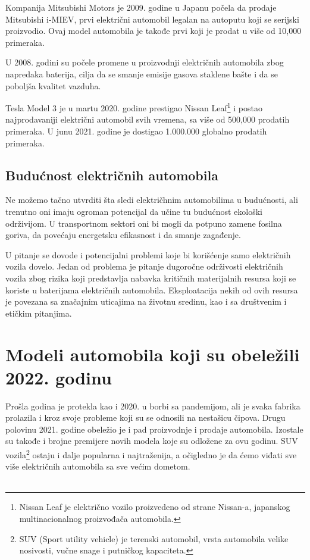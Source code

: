 \documentclass[a4paper]{article}
\begin{document}
Kompanija Mitsubishi Motors je 2009. godine u Japanu počela da prodaje Mitsubishi i-MIEV, prvi električni automobil legalan na autoputu koji se serijski proizvodio. Ovaj model automobila je takođe prvi koji je prodat u više od 10,000 primeraka.

U 2008. godini su počele promene u proizvodnji električnih automobila zbog napredaka baterija, cilja da se smanje emisije gasova staklene bašte i da se poboljša kvalitet vazduha.

Tesla Model 3 je u martu 2020. godine prestigao Nissan Leaf\footnote{Nissan Leaf je električno vozilo proizvedeno od strane Nissan-a, japanskog multinacionalnog proizvođača automobila.} i postao najprodavaniji električni automobil svih vremena, sa više od 500,000 prodatih primeraka. U junu 2021. godine je dostigao 1.000.000 globalno prodatih primeraka.


\subsection{Budućnost električnih automobila}
\label{subsec:podnaslov3}


Ne možemo tačno utvrditi šta sledi električhnim automobilima u budućnosti, ali trenutno oni imaju ogroman potencijal da učine tu budućnost ekološki održivijom. U transportnom sektori oni bi mogli da potpuno zamene fosilna goriva, da povećaju energetsku efikasnost i da smanje zagađenje.

U pitanje se dovode i potencijalni problemi koje bi korišćenje samo električnih vozila dovelo. Jedan od problema je pitanje dugoročne održivosti električnih vozila zbog rizika koji predstavlja nabavka kritičnih materijalnih resursa koji se koriste u baterijama električnih automobila. Eksploatacija nekih od ovih resursa je povezana sa značajnim uticajima na životnu sredinu, kao i sa društvenim i etičkim pitanjima. 



\section{Modeli automobila koji su obeležili 2022. godinu\vspace{2ex}}
\label{sec:MODELI AUTOMOBILA KOJI SU OBELEŽILI 2022. GODINU}

   Prošla godina je protekla kao i 2020. u borbi sa pandemijom, ali je svaka fabrika prolazila i kroz svoje probleme koji su se odnosili na nestašicu čipova. Drugu polovinu 2021. godine obeležio je i pad proizvodnje i prodaje automobila. Izostale su takođe i brojne premijere novih modela koje su odložene za ovu godinu. SUV vozila\footnote{SUV (Sport utility vehicle) je terenski automobil, vrsta automobila velike nosivosti, vučne snage i putničkog kapaciteta.} ostaju i dalje popularna i najtraženija, a očigledno je da ćemo viđati sve više električnih automobila sa sve većim dometom.\\\\
\end{document}
